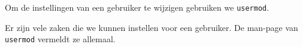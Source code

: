 Om de instellingen van een gebruiker te wijzigen gebruiken we \texttt{usermod}.

Er zijn vele zaken die we kunnen instellen voor een gebruiker. De man-page van \texttt{usermod} vermeldt ze allemaal.


